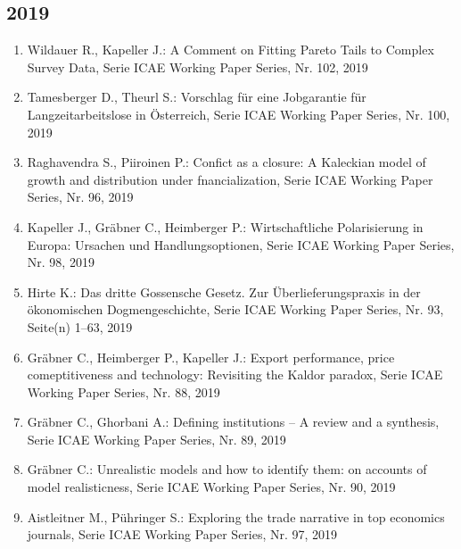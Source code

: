\subsection*{2019}
\begin{enumerate}
    	 \item Wildauer R., Kapeller J.: A Comment on Fitting Pareto Tails to Complex Survey Data, Serie ICAE Working Paper Series, Nr. 102, 2019
	 \item Tamesberger D., Theurl S.: Vorschlag für eine Jobgarantie für Langzeitarbeitslose in Österreich, Serie ICAE Working Paper Series, Nr. 100, 2019
	 \item Raghavendra S., Piiroinen P.: Confict as a closure: A Kaleckian model of growth and distribution under fnancialization, Serie ICAE Working Paper Series, Nr. 96, 2019
	 \item Kapeller J., Gräbner C., Heimberger P.: Wirtschaftliche Polarisierung in Europa: Ursachen und Handlungsoptionen, Serie ICAE Working Paper Series, Nr. 98, 2019
	 \item Hirte K.: Das dritte Gossensche Gesetz. Zur Überlieferungspraxis in der ökonomischen Dogmengeschichte, Serie ICAE Working Paper Series, Nr. 93, Seite(n) 1--63, 2019
	 \item Gräbner C., Heimberger P., Kapeller J.: Export performance, price comeptitiveness and technology: Revisiting the Kaldor paradox, Serie ICAE Working Paper Series, Nr. 88, 2019
	 \item Gräbner C., Ghorbani A.: Defining institutions -- A review and a synthesis, Serie ICAE Working Paper Series, Nr. 89, 2019
	 \item Gräbner C.: Unrealistic models and how to identify them: on accounts of model realisticness, Serie ICAE Working Paper Series, Nr. 90, 2019
	 \item Aistleitner M., Pühringer S.: Exploring the trade narrative in top economics journals, Serie ICAE Working Paper Series, Nr. 97, 2019
\end{enumerate}
